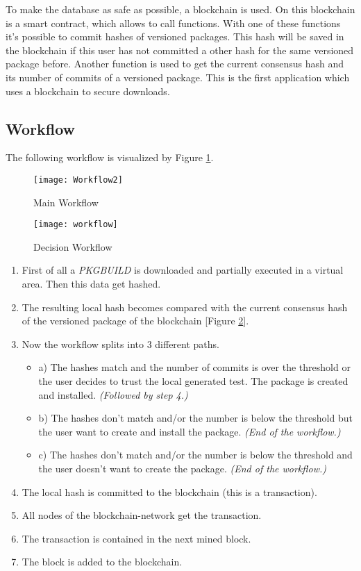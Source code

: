 To make the database as safe as possible, a blockchain is used. On this blockchain is a smart contract, which allows to call functions. With one of these functions it's possible to commit hashes of versioned packages. This hash will be saved in the blockchain if this user has not committed a other hash for the same versioned package before. Another function is used to get the current consensus hash and its number of commits of a versioned package. This is the first application which uses a blockchain to secure downloads.

\subsection*{Workflow}
The following workflow is visualized by Figure \ref{fig:main_workflow}.
\begin{figure}
	\centering
		\texttt{[image: Workflow2]}
	\caption{Main Workflow}
	\label{fig:main_workflow}
\end{figure}

\begin{figure}
	\centering
		\texttt{[image: workflow]}
	\caption{Decision Workflow}
	\label{fig:decision_workflow}
\end{figure}


\begin{enumerate}
	\item First of all a \textit{PKGBUILD} is downloaded and partially executed in a virtual area. Then this data get hashed. 
	\item The resulting local hash becomes compared with the current consensus hash of the versioned package of the blockchain [Figure \ref{fig:decision_workflow}]. 
	\item Now the workflow splits into 3 different paths.
	\begin{itemize}
		\item a) The hashes match and the number of commits is over the threshold or the user decides to trust the local generated test. The package is created and installed. \textit{(Followed by step 4.)}
		\item b) The hashes don't match and/or the number is below the threshold but the user want to create and install the package. \textit{(End of the workflow.)}
		\item c) The hashes don't match and/or the number is below the threshold and the user doesn't want to create the package. \textit{(End of the workflow.)}
	\end{itemize}
	\item The local hash is committed to the blockchain (this is a transaction).
	\item All nodes of the blockchain-network get the transaction.
	\item The transaction is contained in the next mined block.
	\item The block is added to the blockchain.
\end{enumerate}